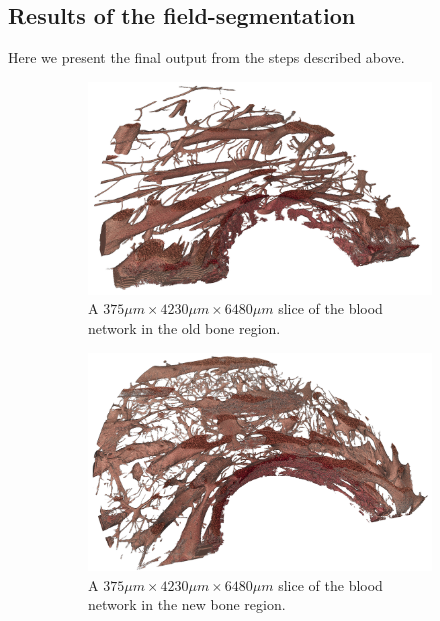 \subsection{Results of the field-segmentation}

Here we present the final output from the steps described above.

\begin{figure}
    \centering
    \begin{subfigure}[b]{\linewidth}
    \centering
        \includegraphics[width=.7\linewidth]{figures/blood_old_bone_100.png}
        \caption{A $375\mu m \times 4230\mu m \times 6480\mu m$ slice of the blood network in the old bone region.}
        \label{fig:blood-old-slice}
    \end{subfigure}
    \begin{subfigure}[b]{\linewidth}
    \centering
        \includegraphics[width=.7\linewidth]{figures/blood_new_bone_100.png}
        \caption{A $375\mu m \times 4230\mu m \times 6480\mu m$ slice of the blood network in the new bone region.}
        \label{fig:blood-new-slice}
    \end{subfigure}
    \begin{subfigure}[b]{.48\linewidth}
    \centering

\end{subfigure}
\end{figure}
